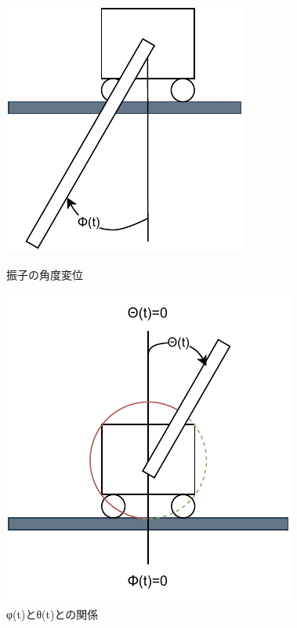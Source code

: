 \begin{enumerate}
        \begin{figure}[h]
          \centering
          \begin{minipage}{0.45\textwidth}
            \centering
            \includegraphics[scale=0.9]{sozai/shinnshinokakudohenni.pdf}
            \caption{振子の角度変位}
          \end{minipage}
          \hfill
          \begin{minipage}{0.45\textwidth}
            \centering
            \includegraphics[scale=0.75]{sozai/theta_relation.pdf}
            \caption{φ(t)とθ(t)との関係}
          \end{minipage}
        \end{figure}
        
\end{enumerate}


